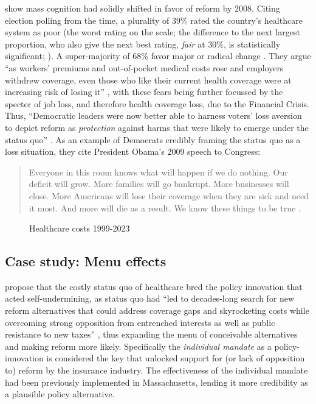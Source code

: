 \documentclass[11pt]{article}
\begin{document}
\textcite[][]{Jacobs2014} show mass cognition had solidly shifted in favor of reform by 2008. Citing election polling from the time, a plurality of 39\% rated the country's healthcare system as poor (the worst rating on the scale; the difference to the next largest proportion, who also give the next best rating, \textit{fair} at 30\%, is statistically significant; ). A super-majority of 68\% favor major or radical change \parencite[][p. 2058]{Blendon2008}. They argue \enquote{as workers' premiums and out-of-pocket medical costs rose and employers withdrew coverage, even those who like their current health coverage were at increasing risk of losing it} , with these fears being further focussed by the specter of job loss, and therefore health coverage loss, due to the Financial Crisis. Thus, \enquote{Democratic leaders were now better able to harness voters' loss aversion to depict reform as \textit{protection} against harms that were likely to emerge under the status quo} . As an example of Democrats credibly framing the status quo as a loss situation, they cite President Obama's 2009 speech to Congress:

\begin{quote}
  Everyone in this room knows what will happen if we do nothing. Our deficit will grow. More families will go bankrupt. More businesses will close. More Americans will lose their coverage when they are sick and need it most. And more will die as a result. We know these things to be true \parencite[][]{Obama2009}.
\end{quote}

\begin{figure}[H]
  \sffamily
  \caption{Healthcare costs 1999-2023}
  
  \label{fig:costs}
\end{figure}

\subsection*{Case study: Menu effects}

\textcite[][]{Jacobs2014} propose that the costly status quo of healthcare bred the policy innovation that acted self-undermining, as status quo had \enquote{led to decades-long search for new reform alternatives that could address coverage gaps and skyrocketing costs while overcoming strong opposition from entrenched interests as well as public resistance to new taxes} , thus expanding the menu of conceivable alternatives and making reform more likely. Specifically the \textit{individual mandate} as a policy-innovation is considered the key that unlocked support for (or lack of opposition to) reform by the insurance industry. The effectiveness of the individual mandate had been previously implemented in Massachusetts, lending it more credibility as a plausible policy alternative.
\end{document}
